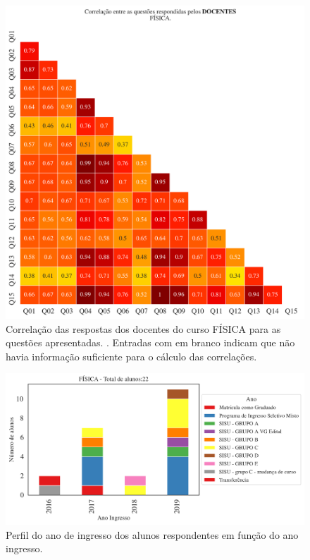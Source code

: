 \documentclass[a4paper,10pt]{article}
\begin{document}
\begin{figure}[h]
\centering
\includegraphics[width=0.999\linewidth]{matriz_corr__docentes_5000613.png}
\caption{\label{fig:corr_docentes}Correlação das respostas dos docentes do curso FÍSICA para as questões apresentadas. . Entradas com em branco indicam que não havia informação suficiente para o cálculo das correlações.}
\end{figure}
\begin{figure}[h]
\centering
\includegraphics[width=0.85\linewidth]{ingresso_discentes_curso_ano_5000613.png}
\caption{\label{fig:ingresso_ano} Perfil do ano de ingresso dos alunos respondentes em função do ano ingresso.}
\end{figure}
\end{document}
